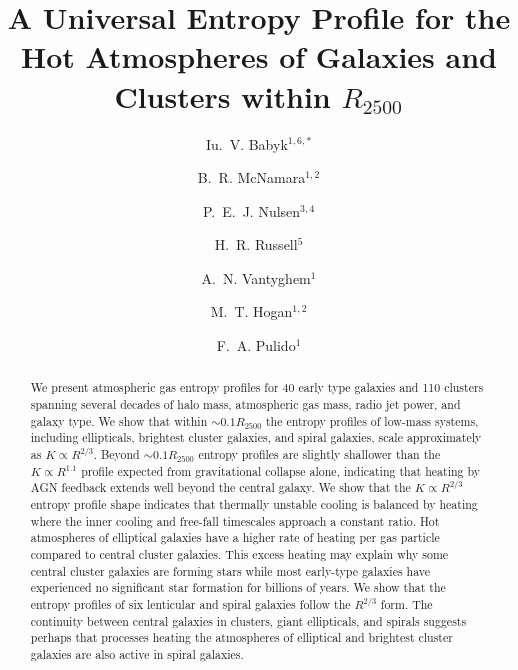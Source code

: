 \documentclass[apjl]{emulateapj}
\begin{document}
\title{A Universal Entropy Profile for the Hot Atmospheres of Galaxies and Clusters within $R_{2500}$}
\author{Iu.~V. Babyk$^{1,6,\ast}$}
\author{B.~R. McNamara$^{1,2}$}
\author{P.~E.~J. Nulsen$^{3,4}$}
\author{H.~R. Russell$^{5}$}
\author{A.~N. Vantyghem$^{1}$}
\author{M.~T. Hogan$^{1,2}$}
\author{F.~A. Pulido$^{1}$}


\begin{abstract}
We present atmospheric gas entropy profiles for 40 early type galaxies and 110 clusters spanning several decades of halo mass, atmospheric gas mass, radio jet power, and galaxy type. We show that within $\sim 0.1R_{2500}$ the entropy profiles of low-mass systems, including ellipticals, brightest cluster galaxies, and spiral galaxies, scale approximately as $K\propto R^{2/3}$.  Beyond $\sim 0.1R_{2500}$ entropy profiles are slightly shallower than the $K \propto R^{1.1}$ profile expected from gravitational collapse alone, indicating that heating by AGN feedback extends well beyond the central galaxy.  We show that the $K\propto R^{2/3}$ entropy profile shape indicates that thermally unstable cooling is balanced by heating where the inner cooling and free-fall timescales approach a constant ratio.   Hot atmospheres of elliptical galaxies have a higher rate of heating per gas particle compared to central cluster galaxies.  This excess heating may explain why some central cluster galaxies are forming stars while most early-type galaxies have experienced no significant star formation for billions of years.  We show that the entropy profiles of six lenticular and spiral galaxies follow the $R^{2/3}$ form.  The continuity between central galaxies in clusters, giant ellipticals, and spirals suggests perhaps that processes heating the atmospheres of elliptical and brightest cluster galaxies are also active in spiral galaxies.   

\end{abstract}
\end{document}
